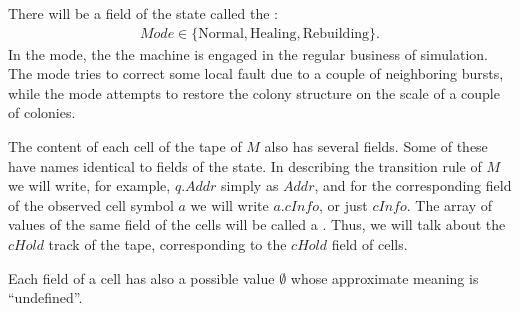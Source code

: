 \documentclass[12pt]{memoir}
\newcommand{\fld}[1]{\ensuremath{\textit{#1}}}
\newcommand{\Addr}{\fld{Addr}}
\newcommand{\cHold}{\fld{cHold}}
\newcommand{\cInfo}{\fld{cInfo}}
\newcommand{\Mode}{\fld{Mode}}
\newcommand{\Rebuilding}{\mathrm{Rebuilding}}
\newcommand{\Normal}{\mathrm{Normal}}
\newcommand{\Healing}{\mathrm{Healing}}
\begin{document}
There will be a field of the state called the :
 \begin{align*}
   \Mode\in\{ \Normal,\Healing, \Rebuilding \}.
 \end{align*}
In the  mode, the the machine is engaged 
in the regular business of simulation.
The  mode tries to correct some local fault due to a couple of neighboring
bursts, while the  mode attempts to restore the colony structure
on the scale of a couple of colonies.

The content of each cell of the tape of \( M \) also has several fields.
Some of these have names identical to fields of the state.
In describing the transition rule of \( M \) we will write, for example,
\( q.\Addr \) simply as \( \Addr \), and for the corresponding field of the
observed cell symbol \( a \) we will write \( a.\cInfo \), or just \( \cInfo \).
The array of values of the same field of the cells will be called a .
Thus, we will talk about the \( \cHold \) track of the tape, corresponding to the
\( \cHold \) field of cells.

Each field of a cell has also a possible value
\( \emptyset \) whose approximate meaning is ``undefined''.
\end{document}
